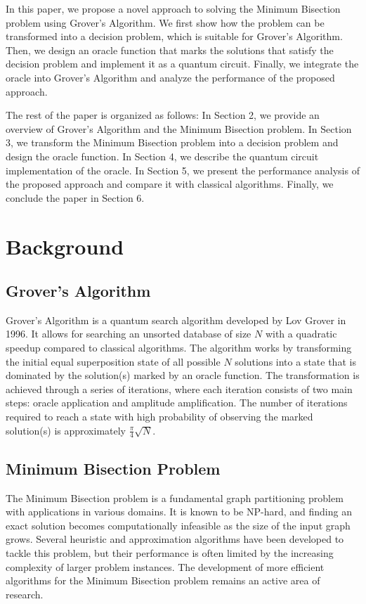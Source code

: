 In this paper, we propose a novel approach to solving the Minimum Bisection problem using Grover's Algorithm. We first show how the problem can be transformed into a decision problem, which is suitable for Grover's Algorithm. Then, we design an oracle function that marks the solutions that satisfy the decision problem and implement it as a quantum circuit. Finally, we integrate the oracle into Grover's Algorithm and analyze the performance of the proposed approach.

The rest of the paper is organized as follows: In Section 2, we provide an overview of Grover's Algorithm and the Minimum Bisection problem. In Section 3, we transform the Minimum Bisection problem into a decision problem and design the oracle function. In Section 4, we describe the quantum circuit implementation of the oracle. In Section 5, we present the performance analysis of the proposed approach and compare it with classical algorithms. Finally, we conclude the paper in Section 6.

\section{Background}

\subsection{Grover's Algorithm}

Grover's Algorithm is a quantum search algorithm developed by Lov Grover in 1996. It allows for searching an unsorted database of size $N$ with a quadratic speedup compared to classical algorithms. The algorithm works by transforming the initial equal superposition state of all possible $N$ solutions into a state that is dominated by the solution(s) marked by an oracle function. The transformation is achieved through a series of iterations, where each iteration consists of two main steps: oracle application and amplitude amplification. The number of iterations required to reach a state with high probability of observing the marked solution(s) is approximately $\frac{\pi}{4}\sqrt{N}$.

\subsection{Minimum Bisection Problem}

The Minimum Bisection problem is a fundamental graph partitioning problem with applications in various domains. It is known to be NP-hard, and finding an exact solution becomes computationally infeasible as the size of the input graph grows. Several heuristic and approximation algorithms have been developed to tackle this problem, but their performance is often limited by the increasing complexity of larger problem instances. The development of more efficient algorithms for the Minimum Bisection problem remains an active area of research.

